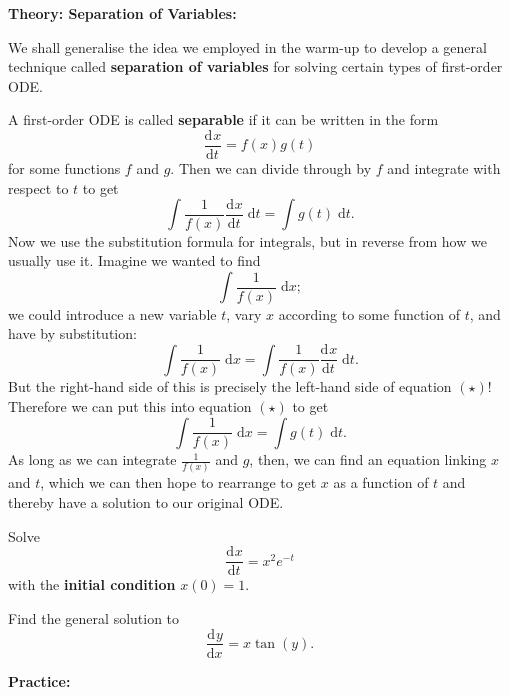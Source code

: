\documentclass{article}
\newcommand{\deriv}[3][]{\frac{\mathrm{d}^{#1}#2}{\mathrm{d}#3^{#1}}}
\newcommand{\diff}{\;\mathrm{d}}
\begin{document}
\clearpage










\textbf{Theory: Separation of Variables:}

\bigskip

We shall generalise the idea we employed in the warm-up to develop a general technique called \textbf{separation of variables} for solving certain types of first-order ODE.

A first-order ODE is called \textbf{separable} if it can be written in the form
\[\deriv{x}{t} = f(x)g(t)\]
for some functions $f$ and $g$. Then we can divide through by $f$ and integrate with respect to $t$ to get
\begin{equation}
	\int\frac{1}{f(x)}\deriv{x}{t}\diff t=\int g(t)\diff t.\tag{$\star$}
\end{equation}
Now we use the substitution formula for integrals, but in reverse from how we usually use it. Imagine we wanted to find
\[\int\frac{1}{f(x)}\diff x;\]
we could introduce a new variable $t$, vary $x$ according to some function of $t$, and have by substitution:
\[\int \frac{1}{f(x)}\diff x = \int \frac{1}{f(x)}\deriv{x}{t}\diff t.\]
But the right-hand side of this is precisely the left-hand side of equation $(\star)$! Therefore we can put this into equation $(\star)$ to get
\[\int\frac{1}{f(x)}\diff x = \int g(t)\diff t.\]
As long as we can integrate $\frac{1}{f(x)}$ and $g$, then, we can find an equation linking $x$ and $t$, which we can then hope to rearrange to get $x$ as a function of $t$ and thereby have a solution to our original ODE.\medskip


Solve
\[\deriv{x}{t} = x^2e^{-t}\]
with the \textbf{initial condition} $x(0)=1$.

\vfill


Find the general solution to
\[\deriv{y}{x} = x\tan(y).\]












\clearpage






\textbf{Practice:}\bigskip
\end{document}
